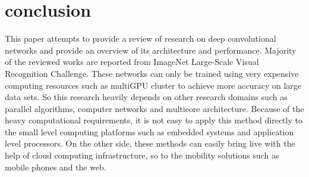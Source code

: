 \documentclass[a4paper]{article}
\begin{document}
\section{conclusion}
This paper attempts to provide a  review of research on deep convolutional networks  and provide an overview of  its architecture and performance. Majority of the reviewed  works are reported from ImageNet Large-Scale Visual Recognition Challenge. These networks can only be trained using very expensive computing resources such as multiGPU cluster  to achieve more accuracy on large data sets. So  this research heavily depends on other research domains such as parallel algorithms, computer networks and multicore architecture. Because of the heavy computational requirements, it is not easy to apply this method directly  to the small level computing platforms such as embedded systems and application level  processors. On the other side, these methods can easily bring  live with the help of  cloud computing infrastructure, so to the mobility solutions such as mobile phones and the web.



\end{document}
